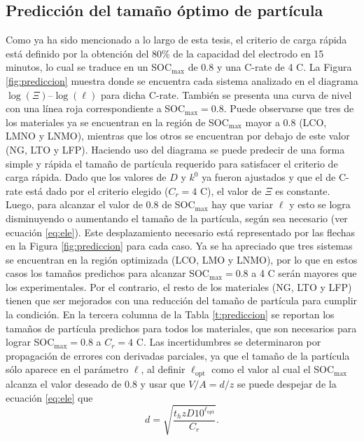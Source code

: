 \subsection{Predicción del tamaño óptimo de partícula}

Como ya ha sido mencionado a lo largo de esta tesis, el criterio de carga rápida
está definido por la obtención del 80\% de la capacidad del electrodo en 15 
minutos, lo cual se traduce en un SOC$_{\max}$ de 0.8 y una C-rate de 4 C. La
Figura \ref{fig:prediccion} muestra donde se encuentra cada sistema analizado en
el diagrama $\log(\Xi)$--$\log(\ell)$ para dicha C-rate. También se presenta una
curva de nivel con una línea roja correspondiente a SOC$_{\max} = 0.8$. Puede
observarse que tres de los materiales ya se encuentran en la región de 
SOC$_{\max}$ mayor a 0.8 (LCO, LMNO y LNMO), mientras que los otros se encuentran
por debajo de este valor (NG, LTO y LFP).
Haciendo uso del diagrama se puede predecir de una forma simple y rápida el tamaño 
de partícula requerido para satisfacer el criterio de carga rápida. Dado que los
valores de $D$ y $k^0$ ya fueron ajustados
y que el de C-rate está dado por el criterio elegido ($C_r = 4$ C), el valor de $\Xi$ es constante. Luego,
para alcanzar el valor de 0.8 de SOC$_{\max}$ hay que variar $\ell$ y esto se
logra disminuyendo o aumentando el tamaño de la partícula, según sea necesario (ver ecuación \ref{eq:ele}).
Este desplazamiento necesario está representado por las flechas en la Figura 
\ref{fig:prediccion} para cada caso. Ya se ha apreciado que tres sistemas se 
encuentran en la región optimizada (LCO, LMO y LNMO), por lo que en estos casos
los tamaños predichos para alcanzar SOC$_{\max} = 0.8$ a 4 C serán mayores que 
los experimentales. Por el contrario, el resto de los materiales (NG, LTO y LFP) 
tienen que ser mejorados con una reducción del tamaño de partícula
para cumplir la condición. En la tercera columna de la Tabla \ref{t:prediccion} 
se reportan los tamaños de partícula predichos para todos los materiales, que son necesarios para lograr SOC$_{\max} = 0.8$ a $C_r = 4$ C. 
Las incertidumbres se determinaron por propagación de errores con 
derivadas parciales, ya que el tamaño de la partícula sólo aparece en el parámetro
$\ell$, al definir $\ell_{\text{opt}}$ como el valor al cual el SOC$_{\max}$ 
alcanza el valor deseado de 0.8 y usar que $V/A = d/z$ se puede despejar de la 
ecuación \ref{eq:ele} que
\begin{equation}
    d = \sqrt{\frac{t_h z D 10^{\ell_{\text{opt}}}}{C_r}}.
\end{equation}

